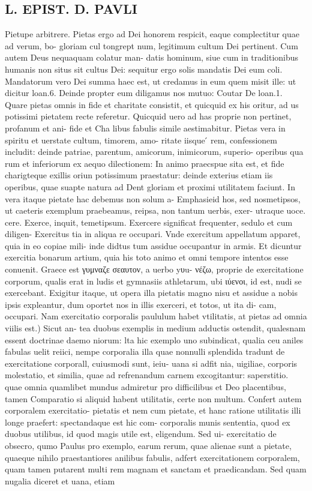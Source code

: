 \documentclass{article}
\begin{document}
\begin{pages}
\section*{L. EPIST. D. PAVLI }
\marginpar{[ p.96 ]}\pstart Pietupe arbitrere. Pietas ergo ad Dei honorem respicit, eaque complectitur quae ad verum, bo- gloriam cul tongrept num, legitimum cultum Dei pertinent. Cum autem Deus nequaquam colatur man- datis hominum, siue cum in traditionibus humanis non situs sit cultus Dei: sequitur ergo solis mandatis Dei eum coli. Mandatorum vero Dei summa haec est, ut credamus in eum quem misit ille: ut dicitur loan.6. Deinde propter eum diligamus nos mutuo: Coutar De loan.1. Quare pietas omnis in fide et charitate consistit, et quicquid ex his oritur, ad us potissimi pietatem recte referetur. Quicquid uero ad has proprie non pertinet, profanum et ani- fide et Cha libus fabulis simile aestimabitur. Pietas vera in spiritu et uerstate cultum, timorem, amo- ritate iisque ́ rem, confessionem includit: deinde patriae, parentum, amicorum, inimicorum, superio- operibus qua rum et inferiorum ex aequo dilectionem: In animo praecspue sita est, et fide charigteque  exillis oriun potissimum praestatur: deinde exterius etiam iis operibus, quae suapte natura ad Dent gloriam et proximi utilitatem faciunt. In vera itaque pietate hac debemus non solum a- Emphasieid hos, sed nosmetipsos, ut caeteris exemplum praebeamus, reipsa, non tantum uerbis, exer- utraque uoce. cere. Exerce, inquit, temetipsum. Exercere significat frequenter, sedulo et cum diligen- Exercitus tia in aliqua re occupari. Vnde exercitum appellatum apparet, quia in eo copiae mili- inde didtus tum assidue occupantur in armis. Et dicuntur exercitia bonarum artium, quia his toto animo et omni tempore intentos esse conuenit. Graece est γυμναζε σεαυτον, a uerbo yυu- νέζω, proprie de exercitatione corporum, qualis erat in ludis et gymnasiis athletarum, ubi ιύενοι, id est, nudi se exercebant. Exigitur itaque, ut opera illa pietatis magno nisu et assidue a nobis ipsis expleantur, dum oportet nos in illis exerceri, et totos, ut ita di- cam, occupari.  \pend\pstart Nam exercitatio corporalis paululum habet vtilitatis, at pietas ad omnia viilis est.) Sicut an- tea duobus exemplis in medium adductis ostendit, qualesnam essent doctrinae daemo niorum: lta hic exemplo uno subindicat, qualia ceu aniles fabulas uelit reiici, nempe corporalia illa quae nonnulli splendida tradunt de exercitatione corporall, cuiusmodi sunt, ieiu- uana si adfit nia, uigiliae, corporis molestatio, et similia, quae ad refrenandum carnem excogitantur: saperstitio. quae omnia quamlibet mundus admiretur pro difficilibus et Deo placentibus, tamen Comparatio si aliquid habent utilitatis, certe non multum. Confert autem corporalem exercitatio- pietatis et nem cum pietate, et hanc ratione utilitatis illi longe praefert: spectandaque est hic com- corporalis munis sententia, quod ex duobus utilibus, id quod magis utile est, eligendum. Sed ui- exercitatio de obsecro, qumo Paulus pro exemplo, earum rerum, quae alienae sunt a pietate, quaeque  nihilo praestantiores anilibus fabulis, adfert exercitationem corporalem, quam tamen putarent multi rem magnam et sanctam et praedicandam. Sed quam nugalia diceret et uana, etiam 
\end{pages}
\end{document}
